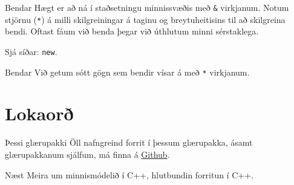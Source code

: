 \documentclass[handout]{beamer}
\begin{document}
\begin{frame}[fragile]{Bendar}
    Hægt er að ná í staðsetningu minnissvæðis með \texttt{\&} virkjanum. Notum stjörnu (\texttt{*}) á milli skilgreiningar á taginu og breytuheitisins til að skilgreina bendi.
    Oftast fáum við benda þegar við úthlutum minni sérstaklega. 
    
    Sjá síðar: \texttt{new}.
\end{frame}

\begin{frame}[fragile]{Bendar}
    Við getum sótt gögn sem bendir vísar á með \texttt{*} virkjanum.
\end{frame}


\section{Lokaorð}

\begin{frame}{Þessi glærupakki}
    Öll nafngreind forrit í þessum glærupakka, ásamt glærupakkanum sjálfum, má finna á  \href{https://github.com/Ernir/kennsluefni/tree/master/T2/Code/w1}{Github}.
\end{frame}


\begin{frame}{Næst}
    Meira um minnismódelið í C++, hlutbundin forritun í C++.
\end{frame}
\end{document}
